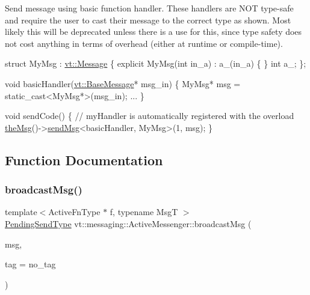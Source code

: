 Send message using basic function handler. These handlers are N\+OT type-\/safe and require the user to cast their message to the correct type as shown. Most likely this will be deprecated unless there is a use for this, since type safety does not cost anything in terms of overhead (either at runtime or compile-\/time).


\begin{DoxyCode}
\textcolor{keyword}{struct }MyMsg : \hyperlink{structvt_1_1messaging_1_1_active_msg}{vt::Message} \{
  \textcolor{keyword}{explicit} MyMsg(\textcolor{keywordtype}{int} in\_a) : a\_(in\_a) \{ \}
  \textcolor{keywordtype}{int} a\_;
\};

\textcolor{keywordtype}{void} basicHandler(\hyperlink{structvt_1_1messaging_1_1_base_msg}{vt::BaseMessage}* msg\_in) \{
  MyMsg* msg = \textcolor{keyword}{static\_cast<}MyMsg*\textcolor{keyword}{>}(msg\_in);
  ...
\}

\textcolor{keywordtype}{void} sendCode() \{
  \textcolor{comment}{// myHandler is automatically registered with the overload}
  \hyperlink{namespacevt_aeafd31f866aeb4dc6fc2f6ee97136350}{theMsg}()->\hyperlink{group__preregister_ga0162a39473e7f9b490a79a7983d949ac}{sendMsg}<basicHandler, MyMsg>(1, msg);
\}
\end{DoxyCode}
 

\subsection{Function Documentation}
\mbox{\label{group__basicsend_ga06f3b2d69156852600ead958ae95e3c9}} 
\subsubsection{\texorpdfstring{broadcast\+Msg()}{broadcastMsg()}}
{\footnotesize\ttfamily template$<$Active\+Fn\+Type $\ast$ f, typename MsgT $>$ \\
\hyperlink{structvt_1_1messaging_1_1_active_messenger_a3626a6ca76d8ad4ec7c3b47a2c70d3a8}{Pending\+Send\+Type} vt\+::messaging\+::\+Active\+Messenger\+::broadcast\+Msg (\begin{DoxyParamCaption}\item[{\hyperlink{structvt_1_1messaging_1_1_msg_ptr_thief}{Msg\+Ptr\+Thief}$<$ MsgT $>$}]{msg,  }\item[{\hyperlink{namespacevt_a84ab281dae04a52a4b243d6bf62d0e52}{Tag\+Type}}]{tag = {\ttfamily no\+\_\+tag} }\end{DoxyParamCaption})}



